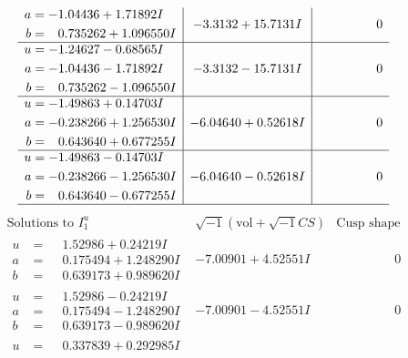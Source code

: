 \documentclass[1p]{elsarticle_modified}
\theoremstyle{definition}
\newcommand{\I}{\sqrt{-1}}
\begin{document}
$$\begin{array}{c|c|c}
\begin{aligned}
a &= -1.04436 + 1.71892 I \\
b &= \phantom{-}0.735262 + 1.096550 I\end{aligned}
 & -3.3132 + 15.7131 I & \phantom{-0.000000 } 0 \\ \hline\begin{aligned}
u &= -1.24627 - 0.68565 I \\
a &= -1.04436 - 1.71892 I \\
b &= \phantom{-}0.735262 - 1.096550 I\end{aligned}
 & -3.3132 - 15.7131 I & \phantom{-0.000000 } 0 \\ \hline\begin{aligned}
u &= -1.49863 + 0.14703 I \\
a &= -0.238266 + 1.256530 I \\
b &= \phantom{-}0.643640 + 0.677255 I\end{aligned}
 & -6.04640 + 0.52618 I & \phantom{-0.000000 } 0 \\ \hline\begin{aligned}
u &= -1.49863 - 0.14703 I \\
a &= -0.238266 - 1.256530 I \\
b &= \phantom{-}0.643640 - 0.677255 I\end{aligned}
 & -6.04640 - 0.52618 I & \phantom{-0.000000 } 0\\
 \hline 
 \end{array}$$\newpage$$\begin{array}{c|c|c}  
\text{Solutions to }I^u_{1}& \I (\text{vol} + \sqrt{-1}CS) & \text{Cusp shape}\\
 \hline 
\begin{aligned}
u &= \phantom{-}1.52986 + 0.24219 I \\
a &= \phantom{-}0.175494 + 1.248290 I \\
b &= \phantom{-}0.639173 + 0.989620 I\end{aligned}
 & -7.00901 + 4.52551 I & \phantom{-0.000000 } 0 \\ \hline\begin{aligned}
u &= \phantom{-}1.52986 - 0.24219 I \\
a &= \phantom{-}0.175494 - 1.248290 I \\
b &= \phantom{-}0.639173 - 0.989620 I\end{aligned}
 & -7.00901 - 4.52551 I & \phantom{-0.000000 } 0 \\ \hline\begin{aligned}
u &= \phantom{-}0.337839 + 0.292985 I \\

\end{aligned}
\end{array}$$
\end{document}

